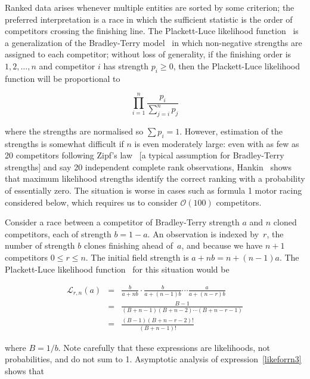 \documentclass[sts]{imsart}
\begin{document}
Ranked data arises whenever multiple entities are sorted by some
criterion; the preferred interpretation is a race in which the
sufficient statistic is the order of competitors crossing the
finishing line.  The Plackett-Luce likelihood
function~\cite{luce1959,plackett1975} is a generalization of the
Bradley-Terry model~\cite{bradley1952} in which non-negative strengths
are assigned to each competitor; without loss of generality, if the
finishing order is $1,2,\ldots,n$ and competitor $i$ has strength
$p_i\geqslant 0$, then the Plackett-Luce likelihood function will be
proportional to

\begin{equation}\label{plackettluce}
\prod_{i=1}^n\frac{p_i}{\sum_{j=i}^np_j}
\end{equation}

\noindent where the strengths are normalised so $\sum p_i=1$.
However, estimation of the strengths is somewhat difficult if $n$ is
even moderately large: even with as few as 20 competitors following
Zipf's law~\cite{zipf1949} [a typical assumption for Bradley-Terry
  strengths] and say 20 independent complete rank observations,
Hankin~\cite{hankin2017_rmd} shows that maximum likelihood strengths
identify the correct ranking with a probability of essentially zero.
The situation is worse in cases such as formula 1 motor racing
considered below, which requires us to consider ${\mathcal O}(100)$
competitors.

Consider a race between a competitor of Bradley-Terry strength $a$ and
$n$ cloned competitors, each of strength $b=1-a$.  An observation is
indexed by~$r$, the number of strength $b$ clones finishing ahead
of~$a$, and because we have $n+1$ competitors %
$0\leqslant r\leqslant n$.  The initial field strength is
$a+nb=n+(n-1)a$.  The Plackett-Luce likelihood
function~\cite{luce1959,plackett1975} for this situation would be

\begin{eqnarray}\label{likeforrn1}
  \mathcal{L}_{r,n}(a) &=&
\frac{b}{a+ n   b}\cdot
\frac{b}{a+(n-1)b}\cdots\frac{a}{a+(n-r)b}\nonumber\\
&=& \frac{B-1}{(B+n-1)(B+n-2)\cdots(B+n-r-1)}\nonumber\\ 
&=& \frac{(B-1)(B+n-r-2)!}{(B+n-1)!}\label{likeforrn3}
\end{eqnarray}

\noindent where $B=1/b$.  Note carefully that these expressions are
likelihoods, not probabilities, and do not sum to 1.  Asymptotic
analysis of expression~\ref{likeforrn3} shows that
\end{document}
